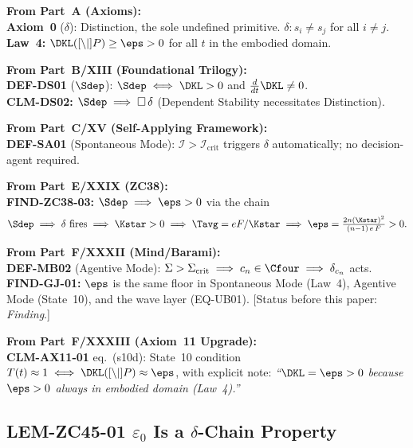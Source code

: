 \documentclass[12pt, a4paper]{article}
\begin{document}
\begin{formalbox}[title={Inherited Objects Used by ZC45}]
\textbf{From Part~A (Axioms):}\\
\textbf{Axiom~0} ($\delta$): Distinction, the sole undefined
primitive. $\delta: s_i \neq s_j$ for all $i \neq j$.\\
\textbf{Law~4:} $\DKL(\Cref\|P) \geq \eps > 0$ for all $t$ in
the embodied domain.

\medskip
\textbf{From Part~B/XIII (Foundational Trilogy):}\\
\textbf{DEF-DS01} ($\Sdep$): $\Sdep \iff \DKL > 0$ and
$\tfrac{d}{dt}\DKL \neq 0$.\\
\textbf{CLM-DS02:} $\Sdep \implies \square\,\delta$
(Dependent Stability necessitates Distinction).

\medskip
\textbf{From Part~C/XV (Self-Applying Framework):}\\
\textbf{DEF-SA01} (Spontaneous Mode): $\mathcal{I} >
\mathcal{I}_{\mathrm{crit}}$ triggers $\delta$ automatically;
no decision-agent required.

\medskip
\textbf{From Part~E/XXIX (ZC38):}\\
\textbf{FIND-ZC38-03:} $\Sdep \implies \eps > 0$ via the chain
\[
  \Sdep \implies \delta\text{ fires}
  \implies \Kstar > 0
  \implies \Tavg = eF/\Kstar \\
  \implies \eps = \tfrac{2n(\Kstar)^2}{(n-1)\,e\,F} > 0.
\]

\medskip
\textbf{From Part~F/XXXII (Mind/Barami):}\\
\textbf{DEF-MB02} (Agentive Mode): $\Sigma >
\Sigma_{\mathrm{crit}} \implies c_n \in \Cfour \implies
\delta_{c_n}$ acts.\\
\textbf{FIND-GJ-01:} $\eps$ is the same floor in Spontaneous
Mode (Law~4), Agentive Mode (State~10), and the wave layer
(EQ-UB01). [Status before this paper: \emph{Finding}.]

\medskip
\textbf{From Part~F/XXXIII (Axiom~11 Upgrade):}\\
\textbf{CLM-AX11-01} eq.~(s10d): State~10 condition
$T(t) \approx 1 \iff \DKL(\Cref\|P) \approx \eps$,
with explicit note: \textit{``$\DKL = \eps > 0$ because $\eps > 0$
always in embodied domain (Law~4).''}
\end{formalbox}

\subsection{LEM-ZC45-01 \quad $\varepsilon_0$ Is a $\delta$-Chain Property}
\end{document}
